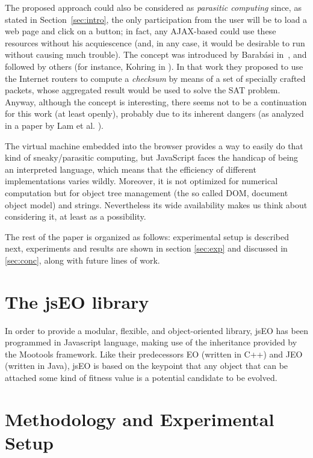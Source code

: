 \documentclass{llncs}
\begin{document}
The proposed approach could also be considered as {\em parasitic
computing} since, as stated in Section~\ref{sec:intro}, the only
participation from the user will be to load a web page and click on a
button; in fact, any AJAX-based could use these resources without his
acquiescence (and, in any case, it would be desirable to run without
causing much trouble).  The concept was introduced by Barab\'asi
in~\cite{Barabasi2001Parasitic}, and followed by others (for instance,
Kohring in \cite{kohring-2003-14}).  In that work they proposed to use
the Internet routers to compute a {\em checksum} by means of a set of
specially crafted packets, whose aggregated result would be used to
solve the SAT problem. Anyway, although the concept is interesting,
there seems not to be a continuation for this work (at least openly),
probably due to its inherent dangers (as analyzed in a paper by Lam et
al.  \cite{puppetnets}).

The virtual machine embedded into the browser provides a way to easily
do that kind of  sneaky/parasitic computing, but JavaScript faces the
handicap of being an interpreted language, which means that the efficiency of different
implementations varies wildly. Moreover, it is not optimized for
numerical computation but for object tree 
management (the so called DOM, document
object model) and strings.
Nevertheless its wide availability makes us think about considering it, at
least as a possibility. 

The rest of the paper is organized as follows: experimental setup is described next,  experiments and results are shown in section 
\ref{sec:exp} and discussed in \ref{sec:conc}, along with future lines
of work. 

\section{The jsEO library}
\label{sec:jseo}
In order to provide a modular, flexible, and object-oriented library, jsEO has been programmed in Javascript language, making use of the inheritance provided by the Mootools framework. Like their predecessors EO (written in C++) and JEO (written in Java), jsEO is based on the keypoint that any object that can be attached some kind of fitness value is a potential candidate to be evolved.

\section{Methodology and Experimental Setup}
\label{sec:method}
\end{document}
